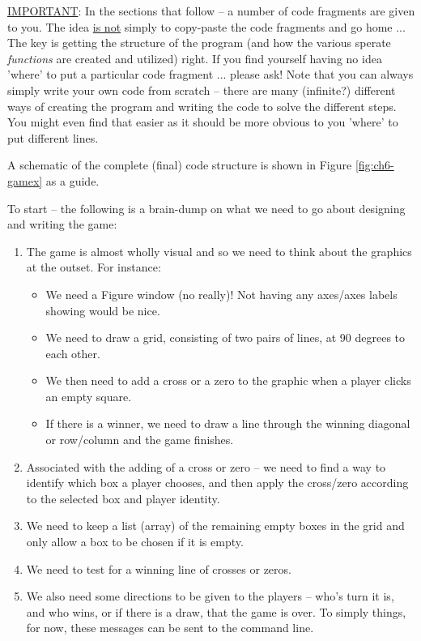\documentclass{tufte-book} %
\begin{document}
\uline{IMPORTANT}: In the sections that follow -- a number of code fragments are given to you. The idea \uline{is not} simply to copy-paste the code fragments and go home ... The key is getting the structure of the program (and how the various sperate \textit{functions} are created and utilized) right. If you find yourself having no idea 'where' to put a particular code fragment ... please ask! Note that you can always simply write your own code from scratch -- there are many (infinite?) different ways of creating the program and writing the code to solve the different steps. You might even find that easier as it should be more obvious to you 'where' to put different lines.

A schematic of the complete (final) code structure is shown in Figure \ref{fig:ch6-gamex} as a guide.

\vspace{1mm}
To start -- the following is a brain-dump on what we need to go about designing and writing the game:

\begin{enumerate}[noitemsep]

\item The game is almost wholly visual and so we need to think about the graphics at the outset. For instance:
\begin{itemize}[noitemsep]
\setlength{\itemindent}{.2in}
\item We need a \textsf{Figure window} (no really)! Not having any axes/axes labels showing would be nice.
\item We need to draw a grid, consisting of two pairs of lines, at 90 degrees to each other.
\item We then need to add a cross or a zero to the graphic when a player clicks an empty square.
\item If there is a winner, we need to draw a line through the winning diagonal or row/column and the game finishes.
\end{itemize}
\item Associated with the adding of a cross or zero -- we need to find a way to  identify which box a player chooses, and then apply the cross/zero according to the selected box and player identity.
\item We need to keep a list (array) of the remaining empty boxes in the grid and only allow a box to be chosen if it is empty.
\item We need to test for a winning line of crosses or zeros.
\item We also need some directions to be given to the players -- who's turn it is, and who wins, or if there is a draw, that the game is over. To simply things, for now, these messages can be sent to the command line.
\end{enumerate}
\end{document}
